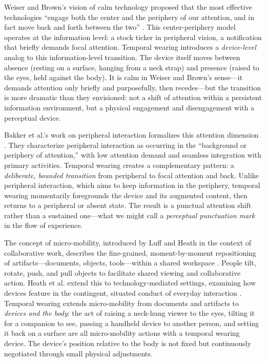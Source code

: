 Weiser and Brown's vision of calm technology proposed that the most effective technologies ``engage both the center and the periphery of our attention, and in fact move back and forth between the two'' \cite{weiser1996calm}. This center-periphery model operates at the information level: a stock ticker in peripheral vision, a notification that briefly demands focal attention. Temporal wearing introduces a \textit{device-level} analog to this information-level transition. The device itself moves between absence (resting on a surface, hanging from a neck strap) and presence (raised to the eyes, held against the body). It is calm in Weiser and Brown's sense---it demands attention only briefly and purposefully, then recedes---but the transition is more dramatic than they envisioned: not a shift of attention within a persistent information environment, but a physical engagement and disengagement with a perceptual device.

Bakker et al.'s work on peripheral interaction formalizes this attention dimension \cite{bakker2015peripheral}. They characterize peripheral interaction as occurring in the ``background or periphery of attention,'' with low attention demand and seamless integration with primary activities. Temporal wearing creates a complementary pattern: a \textit{deliberate, bounded transition} from peripheral to focal attention and back. Unlike peripheral interaction, which aims to keep information in the periphery, temporal wearing momentarily foregrounds the device and its augmented content, then returns to a peripheral or absent state. The result is a punctual attention shift rather than a sustained one---what we might call a \textit{perceptual punctuation mark} in the flow of experience.

The concept of micro-mobility, introduced by Luff and Heath in the context of collaborative work, describes the fine-grained, moment-by-moment repositioning of artifacts---documents, objects, tools---within a shared workspace \cite{luff1998mobility}. People tilt, rotate, push, and pull objects to facilitate shared viewing and collaborative action. Heath et al. extend this to technology-mediated settings, examining how devices feature in the contingent, situated conduct of everyday interaction \cite{heath2000technology}. Temporal wearing extends micro-mobility from documents and artifacts to \textit{devices and the body}: the act of raising a neck-hung viewer to the eyes, tilting it for a companion to see, passing a handheld device to another person, and setting it back on a surface are all micro-mobility actions with a temporal wearing device. The device's position relative to the body is not fixed but continuously negotiated through small physical adjustments.

